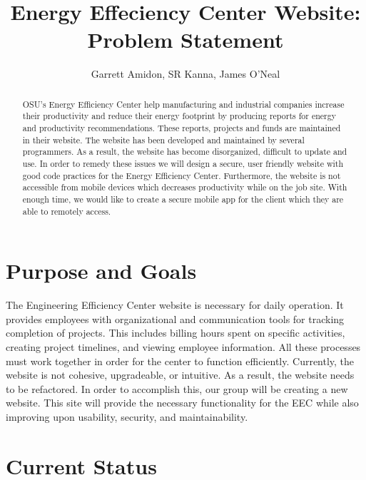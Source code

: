 \documentclass[letterpaper,10pt,titlepage,journal,compsoc,draftclsnofoot,onecolumn]{IEEEtran}
\title{Energy Effeciency Center Website: \\ Problem Statement}
\author{Garrett Amidon, SR Kanna, James O'Neal}
\newcommand\tab[1][1cm]{\hspace*{#1}}
\begin{document}
\begin{titlingpage}
    \maketitle
	\centering{}
    \begin{abstract}
        
        OSU’s Energy Efficiency Center help manufacturing and industrial companies increase their productivity and reduce their energy footprint by producing reports for energy and productivity recommendations. These reports, projects and funds are maintained in their website. The website has been developed and maintained by several programmers. As a result, the website has become disorganized, difficult to update and use. In order to remedy these issues we will design a secure, user friendly website with good code practices for the Energy Efficiency Center. 	Furthermore, the website is not accessible from mobile devices which decreases productivity while on the job site. With enough time, we would like to create a secure mobile app for the client which they are able to remotely access.
        
    \end{abstract}
\end{titlingpage}

\newpage

\tableofcontents{}

\newpage

\section{Purpose and Goals}

\tab The Engineering Efficiency Center website is necessary for daily operation. It provides employees with organizational and communication tools for tracking completion of projects. This includes billing hours spent on specific activities, creating project timelines, and viewing employee information. All these processes must work together in order for the center to function efficiently. Currently, the website is not cohesive, upgradeable, or intuitive. As a result, the website needs to be refactored. In order to accomplish this, our group will be creating a new website. This site will provide the necessary functionality for the EEC while also improving upon usability, security, and maintainability.

\section{Current Status}
\end{document}
